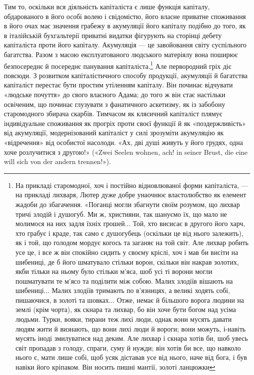 Тим то, оскільки вся діяльність капіталіста є лише функція
капіталу, обдарованого в його особі волею і свідомістю, його
власне приватне споживання в його очах має значення грабежу
в акумуляції його капіталу подібно до того, як в італійській
бухгальтерії приватні видатки фігурують на сторінці дебету
капіталіста проти його капіталу. Акумуляція — це завойовання
світу суспільного багатства. Разом з масою експлуатованого людського
матеріялу вона поширює безпосереднє й посереднє панування
капіталіста.\footnote{
На прикладі старомодної, хоч і постійно відновлюваної форми
капіталіста, — на прикладі лихваря, Лютер дуже добре унаочнює властолюбство
як елемент жадоби до збагачення. «Поганці могли збагнути
своїм розумом, що лихвар тричі злодій і душогуб. Ми ж, християни, так
шануємо їх, що мало не молимося на них задля їхніх грошей... Той, хто
висисає в другого його харч, хто грабує і краде, так само є душогубець
(оскільки це від нього залежить), як і той, що голодом мордує когось
та заганяє на той світ. Але лихвар робить усе це, і все ж він спокійно
сидить у своєму кріслі, хоч і мав би висіти на шибениці, де б його шматувало
стільки ворон, скільки він накрав золотих, якби тільки на ньому
було стільки м’яса, шоб усі ті ворони могли пошматувати те м’ясо та
поділити між собою. Малих злодіїв вішають на шибениці... Малих злодіїв
тримають по в’язницях, а великі ходять собі, пишаючися, в золоті
та шовках... Отже, немає й більшого ворога людини на землі (крім чорта),
як скнара та лихвар, бо він хоче бути богом над усіма людьми. Турки,
вояки, тирани теж лихі люди, однак вони мусять давати людям жити й
визнають, що вони лихі люди й вороги; вони можуть, і-навіть мусять
іноді змилуватися над деким. Але лихвар і скнара хотів би, шоб увесь
світ пропадав з голоду, спраги, суму й нужди; він хотів би все, що навколо
нього є, мати лише собі, щоб усяк діставав усе від нього, наче від бога,
і був навіки його кріпаком. Він носить пишні мантії, золоті ланцюжки
}
Але первородний гріх діє повсюди. З розвитком капіталістичного
способу продукції, акумуляції й багатства капіталіст
перестає бути простим утіленням капіталу. Він починає відчувати
«людське почуття» до свого власного Адама; до того ж він
стає настільки освіченим, що починає глузувати з фанатичного
аскетизму, як із забобону старомодного збирача скарбів. Тимчасом
як клясичний капіталіст плямує індивідуальне споживання
як прогріх проти своєї функції й як «поздержливість» від
акумуляції, модернізований капіталіст у силі зрозуміти акумуляцію
як «відречення» від особистої насолоди. «Ах, дві душі
живуть у його грудях, одна хоче розлучитися з другою!» («Zwei
Seelen wohnen, ach! in seiner Brust, die eine will sich von der
andern trennen!»).

